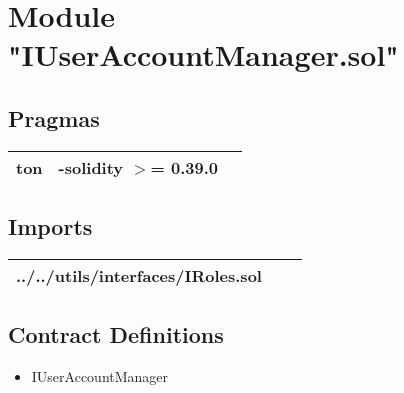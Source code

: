 
\section{Module "IUserAccountManager.sol"}


\subsection{Pragmas}


\noindent\begin{tabular}{|l|l|p{5cm}|}\hline
ton & -solidity $>$= 0.39.0 &\\\hline
\end{tabular}


\subsection{Imports}


\noindent\begin{tabular}{|l|l|p{5cm}|}\hline
../../utils/interfaces/IRoles.sol &\\\hline
\end{tabular}


\subsection{Contract Definitions}

\begin{itemize}
\item IUserAccountManager
\end{itemize}

